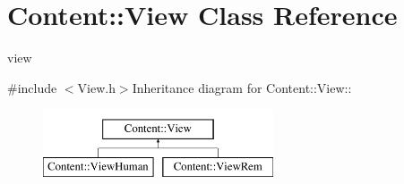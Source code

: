 \hypertarget{classContent_1_1View}{
\section{Content::View Class Reference}
\label{classContent_1_1View}
}


view  


{\ttfamily \#include $<$View.h$>$}Inheritance diagram for Content::View::\begin{figure}[H]
\begin{center}
\leavevmode
\includegraphics[height=2cm]{classContent_1_1View}
\end{center}
\end{figure}
